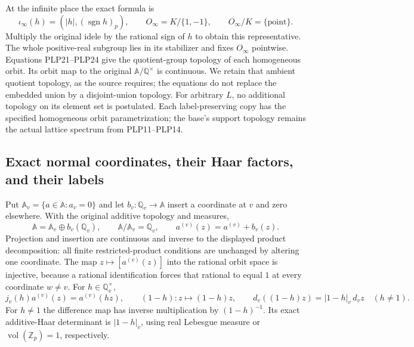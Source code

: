 At the infinite place the exact formula is
\begin{equation}\tag{PLP24}
\iota_\infty(h)=
\left(|h|,(\operatorname{sgn}h)_p\right),\qquad
O_\infty=K/\{1,-1\},\qquad O_\infty/K=\{\mathrm{point}\}.
\end{equation}
Multiply the original idele by the rational sign of $h$ to
obtain this representative. The whole positive-real subgroup
lies in its stabilizer and fixes $O_\infty$ pointwise.
Equations PLP21--PLP24 give the quotient-group topology of each
homogeneous orbit. Its orbit map to the original
$\mathbb A/\mathbb Q^\times$ is continuous. We retain that
ambient quotient topology, as the source requires; the equations
do not replace the embedded union by a disjoint-union topology.
For arbitrary $L$, no additional topology on its element set is
postulated. Each label-preserving copy has the specified homogeneous
orbit parametrization; the base's support topology remains the
actual lattice spectrum from PLP11--PLP14.

\subsection{Exact normal coordinates, their Haar factors, and their labels}

Put $\mathbb A_v=\{a\in\mathbb A:a_v=0\}$ and let
$b_v:\mathbb Q_v\to\mathbb A$ insert a coordinate at $v$ and
zero elsewhere. With the original additive topology and measures,
\begin{equation}\tag{PLP25}
\mathbb A=\mathbb A_v\oplus b_v(\mathbb Q_v),\qquad
\mathbb A/\mathbb A_v=\mathbb Q_v,\qquad
a^{(v)}(z)=a^{(v)}+b_v(z).
\end{equation}
Projection and insertion are continuous and inverse to the displayed
product decomposition: all finite restricted-product conditions
are unchanged by altering one coordinate. The map
$z\mapsto[a^{(v)}(z)]$ into the rational orbit space is injective,
because a rational identification forces that rational to equal
$1$ at every coordinate $w\ne v$.
For $h\in\mathbb Q_v^\times$,
\begin{equation}\tag{PLP26}
j_v(h)a^{(v)}(z)=a^{(v)}(hz),\qquad
(1-h):z\longmapsto(1-h)z,\qquad
d_v((1-h)z)=|1-h|_v\,d_vz\quad(h\ne1).
\end{equation}
For $h\ne1$ the difference map has inverse multiplication by
$(1-h)^{-1}$. Its exact additive-Haar determinant is
$|1-h|_v$, using real Lebesgue measure or
$\operatorname{vol}(\mathbb Z_p)=1$, respectively.

